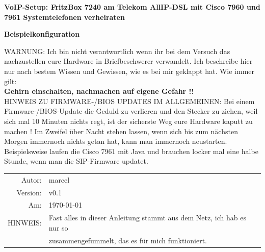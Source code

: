 \documentclass[a4paper,12pt]{scrbook}
\begin{document}
\begin{titlepage}

\begin{center}
{\huge\bfseries VoIP-Setup: FritzBox 7240 am Telekom AllIP-DSL mit Cisco 7960 und 7961 Systemtelefonen verheiraten\par}
\vskip 1cm
\textbf{Beispielkonfiguration}

WARNUNG: Ich bin nicht verantwortlich wenn ihr bei dem Versuch das nachzustellen eure Hardware in Briefbeschwerer verwandelt. Ich
beschreibe hier nur nach bestem Wissen und Gewissen, wie es bei mir geklappt hat. Wie immer gilt:\\


\textbf{Gehirn einschalten, nachmachen auf eigene Gefahr !!}\\


HINWEIS ZU FIRMWARE-/BIOS UPDATES IM ALLGEMEINEN: Bei einem Firmware-/BIOS-Update die Geduld zu verlieren und den Stecker zu ziehen,
weil sich mal 10 Minuten nichts regt, ist der sicherste Weg eure Hardware kaputt zu machen ! Im Zweifel über Nacht stehen lassen, wenn
sich bis zum nächsten Morgen immernoch nichts getan hat, kann man immernoch neustarten. Beispielsweise laufen die Cisco 7961 mit Java und
brauchen locker mal eine halbe Stunde, wenn man die SIP-Firmware updatet. 

\end{center}
 
 \vfill
\vskip 3cm
\flushleft
\begin{tabular}{rl}
Autor: & marcel\\ 
Version: & v0.1\\
Am: & \today\\
HINWEIS: &Fast alles in dieser Anleitung stammt aus dem Netz, ich hab es nur so\\ &zusammengefummelt, das es für mich funktioniert.\\
\end{tabular}
\end{titlepage}

\tableofcontents

\listoffigures



\lstlistoflistings

 
\end{document}
